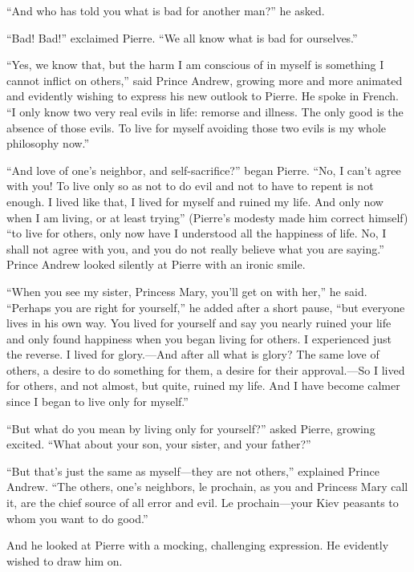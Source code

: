``And who has told you what is bad for another man?'' he asked.

``Bad! Bad!'' exclaimed Pierre. ``We all know what is bad for
ourselves.''

``Yes, we know that, but the harm I am conscious of in myself is
something I cannot inflict on others,'' said Prince Andrew,
growing more and more animated and evidently wishing to express
his new outlook to Pierre. He spoke in French. ``I only know two
very real evils in life: remorse and illness. The only good is
the absence of those evils. To live for myself avoiding those two
evils is my whole philosophy now.''

``And love of one's neighbor, and self-sacrifice?'' began
Pierre. ``No, I can't agree with you! To live only so as not to
do evil and not to have to repent is not enough. I lived like
that, I lived for myself and ruined my life. And only now when I
am living, or at least trying'' (Pierre's modesty made him
correct himself) ``to live for others, only now have I understood
all the happiness of life. No, I shall not agree with you, and
you do not really believe what you are saying.'' Prince Andrew
looked silently at Pierre with an ironic smile.

``When you see my sister, Princess Mary, you'll get on with
her,'' he said. ``Perhaps you are right for yourself,'' he added
after a short pause, ``but everyone lives in his own way. You
lived for yourself and say you nearly ruined your life and only
found happiness when you began living for others. I experienced
just the reverse. I lived for glory.---And after all what is
glory? The same love of others, a desire to do something for
them, a desire for their approval.---So I lived for others, and
not almost, but quite, ruined my life. And I have become calmer
since I began to live only for myself.''

``But what do you mean by living only for yourself?'' asked
Pierre, growing excited. ``What about your son, your sister, and
your father?''

``But that's just the same as myself---they are not others,''
explained Prince Andrew. ``The others, one's neighbors, le
prochain, as you and Princess Mary call it, are the chief source
of all error and evil. Le prochain---your Kiev peasants to whom
you want to do good.''

And he looked at Pierre with a mocking, challenging
expression. He evidently wished to draw him on.


